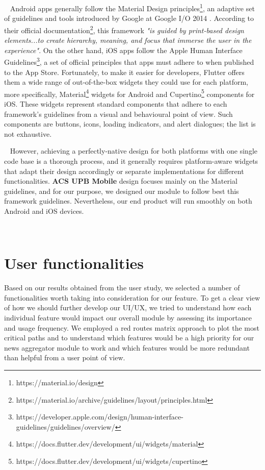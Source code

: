 ~
Android apps generally follow the Material Design principles\footnote{https://material.io/design}, an adaptive set of guidelines and tools introduced by Google at Google I/O 2014 \cite{googleio_material}. According to their official documentation\footnote{https://material.io/archive/guidelines/layout/principles.html}, this framework \textit{"is guided by print-based design elements...to create hierarchy, meaning, and focus that immerse the user in the experience"}. On the other hand, iOS apps follow the Apple Human Interface Guidelines\footnote{https://developer.apple.com/design/human-interface-guidelines/guidelines/overview/}, a set of official principles that apps must adhere to when published to the App Store. Fortunately, to make it easier for developers, Flutter offers them a wide range of out-of-the-box widgets they could use for each platform, more specifically, Material\footnote{https://docs.flutter.dev/development/ui/widgets/material} widgets for Android and Cupertino\footnote{https://docs.flutter.dev/development/ui/widgets/cupertino} components for iOS. These widgets represent standard components that adhere to each framework's guidelines from a visual and behavioural point of view. Such components are buttons, icons, loading indicators, and alert dialogues; the list is not exhaustive.

~
However, achieving a perfectly-native design for both platforms with one single code base is a thorough process, and it generally requires platform-aware widgets that adapt their design accordingly or separate implementations for different functionalities. \textbf{ACS UPB Mobile} design focuses mainly on the Material guidelines, and for our purpose, we designed our module to follow best this framework guidelines. Nevertheless, our end product will run smoothly on both Android and iOS devices.

~

\section{User functionalities}\label{4:user_functionalities}

Based on our results obtained from the user study, we selected a number of functionalities worth taking into consideration for our feature. To get a clear view of how we should further develop our UI/UX, we tried to understand how each individual feature would impact our overall module by assessing its importance and usage frequency. We employed a red routes matrix approach to plot the most critical paths and to understand which features would be a high priority for our news aggregator module to work and which features would be more redundant than helpful from a user point of view. 
~

